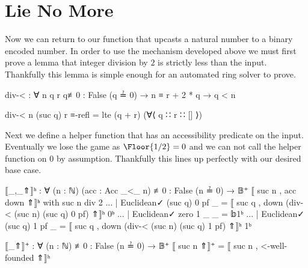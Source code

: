 \documentclass[./Thesis.tex]{subfiles}
\begin{document}
\section{Lie No More}
\label{sec:lie-no-more}
Now we can return to our function that upcasts a natural number to a binary
encoded number. In order to use the mechanism developed above we must first
prove a lemma that integer division by $2$ is strictly less than the input.
Thankfully this lemma is simple enough for an automated ring solver to prove.
\begin{code}
  div-< : ∀ n q r {q≢0 : False (q ≟ 0)} → n ≡ r + 2 * q → q < n
\end{code}
\begin{code}[hide]
  div-< n (suc q) r ≡-refl = lte (q + r) (∀⟨ q ∷ r ∷ [] ⟩)
\end{code}
Next we define a helper function that has an accessibility predicate on the
input. Eventually we lose the game as $\Floor{1 / 2} = 0$ and we can not call
the helper function on $0$ by assumption. Thankfully this lines up perfectly
with our desired base case.
\begin{code}
  ⟦_,_⇑⟧ʰ : ∀ (n : ℕ) (acc : Acc _<_ n) {≢0 : False (n ≟ 0)} → 𝔹⁺
  ⟦ suc n , acc down ⇑⟧ʰ with suc n div 2
  ... | Euclidean✓ (suc q) 0 pf _ = ⟦ suc q , down (div-< (suc n) (suc q) 0 pf) ⇑⟧ʰ 0ᵇ
  ... | Euclidean✓ zero    1 _ _ = 𝕓1ᵇ
  ... | Euclidean✓ (suc q) 1 pf _ = ⟦ suc q , down (div-< (suc n) (suc q) 1 pf) ⇑⟧ʰ 1ᵇ

  ⟦_⇑⟧⁺ : ∀ (n : ℕ) {≢0 : False (n ≟ 0)} → 𝔹⁺
  ⟦ suc n ⇑⟧⁺ = ⟦ suc n , <-well-founded ⇑⟧ʰ
\end{code}
\end{document}
